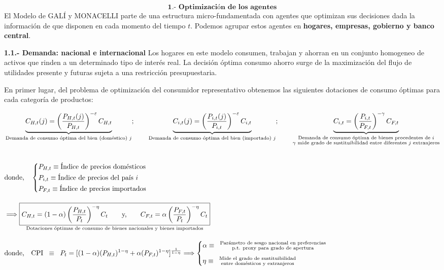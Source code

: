 \documentclass[10pt,a4paper]{article}
\begin{document}
$$\textbf{1.- Optimización de los agentes}$$
El Modelo de GALÍ y MONACELLI parte de una estructura micro-fundamentada con agentes que optimizan sus decisiones dada la información de que disponen en cada momento del tiempo $t$. Podemos agrupar estos agentes en \textbf{hogares, empresas, gobierno y banco central}. 


\textbf{1.1.- Demanda: nacional e internacional}
Los hogares en este modelo consumen, trabajan y ahorran en un conjunto homogeneo de activos que rinden a un determinado tipo de interés real. La decisión óptima consumo ahorro surge de la maximización del flujo de utilidades presente y futuras sujeta a una restricción presupuestaria.

En primer lugar, del problema de optimización del consumidor representativo obtenemos las siguientes dotaciones de consumo óptimas para cada categoría de productos:

$$\begin{aligned}
    &\underbrace{C_{H,t}(j)=\left(\frac{P_{H,t}(j)}{P_{H,t}}\right)^{-\varepsilon}C_{H,t}}_{\text{\scriptsize Demanda de consumo óptima del bien (doméstico) $j$}};\qquad \underbrace{C_{i,t}(j)=\left(\frac{P_{i,t}(j)}{P_{i,t}}\right)^{-\varepsilon}C_{i,t}}_{\text{\scriptsize Demanda de consumo óptima del bien (importado) $j$}};\qquad \underbrace{C_{i,t}=\left(\frac{P_{i,t}}{P_{F,t}}\right)^{-\gamma}C_{F,t}}_{\substack{\text{\scriptsize Demanda de consumo óptima de bienes procedentes de $i$}\\\text{\scriptsize $\gamma$ mide grado de sustituibilidad entre diferentes $j$ extranjeros}}}\\[2em]
    &\text{donde,}\quad 
    \left\{\begin{aligned}
        &P_{H,t}\equiv\text{Índice de precios domésticos}\\
        &P_{i,t}\equiv \text{Índice de precios del país $i$}\\
        &P_{F,t}\equiv\text{Índice de precios importados}
    \end{aligned}\right.\\[1em]
    &\Longrightarrow\underset{\text{\scriptsize Dotaciones óptimas de consumo de bienes nacionales y bienes importados}}{\boxed{C_{H,t}=(1-\alpha)\left(\frac{P_{H,t}}{P_t}\right)^{-\eta}C_t\qquad \text{y,}\qquad C_{F,t}=\alpha\left(\frac{P_{F,t}}{P_t}\right)^{-\eta}C_t}}\\[1em]
    &\text{donde,}\quad \text{CPI}\;\;\equiv\;\;P_t=[(1-\alpha)(P_{H,t})^{1-\eta}+\alpha(P_{F,t})^{1-\eta}]^{\frac{1}{1-\eta}}\Longrightarrow
    \left\{\begin{aligned}
        &\alpha\equiv\;\;\substack{\text{\scriptsize Parámetro de sesgo nacional en preferencias}\\\text{\scriptsize p.t. proxy para grado de apertura}}\\[0.5em]
        &\eta\equiv\;\;\substack{\text{\scriptsize Mide el grado de sustituibilidad}\\\text{\scriptsize entre domésticos y extranjeros}}
    \end{aligned}\right.
\end{aligned}$$
\end{document}

